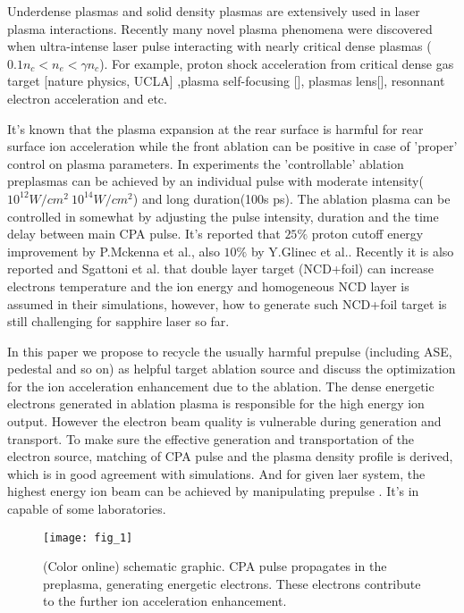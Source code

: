 \documentclass[aip,twocolumn,superscriptaddress,showpacs,amsmath]{revtex4}
\begin{document}
Underdense plasmas and solid density plasmas are extensively used in laser
plasma interactions. Recently many novel plasma phenomena were discovered when
ultra-intense laser pulse interacting with nearly critical dense plasmas ($0.1
n_c<n_e<\gamma n_c$). For example, proton shock acceleration from critical
dense gas target [nature physics, UCLA] ,plasma self-focusing [], plasmas
lens[], resonnant electron acceleration and etc.

It's known that the plasma expansion at the rear surface is harmful for rear
surface ion acceleration \cite{Roth} while the front ablation can be positive
in case of 'proper' control on plasma parameters. In experiments the
'controllable' ablation preplasmas can be achieved by an individual pulse with
moderate intensity($10^{12}W/{cm}^2 ~ 10^{14}W/{cm}^2$) and long duration(100s
ps). The ablation plasma can be controlled in somewhat by adjusting the pulse
intensity, duration and the time delay between main CPA pulse. It's reported
that $25\%$ proton cutoff energy improvement by P.Mckenna et
al.\cite{MCKENNA}, also $10\%$ by Y.Glinec et al.\cite{Glinec}. Recently it is
also reported \cite{Wang} and Sgattoni et al.\cite{Sgat} that double layer
target (NCD+foil) can increase electrons temperature and the ion energy  and
homogeneous NCD layer is assumed in their simulations, however, how to
generate such NCD+foil target is still challenging for sapphire laser so far.

In this paper we propose to recycle the usually harmful prepulse
(including ASE, pedestal and so on) as helpful target ablation source and
discuss the optimization for the ion acceleration enhancement due to the
ablation. The dense energetic electrons generated in ablation plasma is
responsible for the high energy ion output. However the electron beam quality
is vulnerable during generation and transport. To make sure the effective
generation and transportation of the electron source, matching of CPA pulse
and the plasma density profile is derived, which is in good agreement with simulations.
And for given laer system, the highest energy ion beam can
be achieved by manipulating prepulse 
. It's in capable of some laboratories. 

\begin{figure}[htbp]
\texttt{[image: fig\_1]}
\caption{\label{fig1}(Color online) schematic graphic. CPA pulse propagates in
the preplasma, generating energetic electrons. These electrons
contribute to the further ion acceleration enhancement.}
\end{figure}
\end{document}
